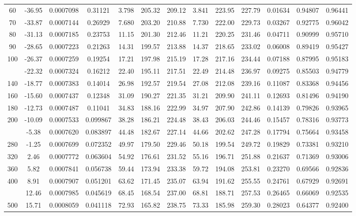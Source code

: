 \documentclass[12pt,a3paper]{article}
\begin{document}
\begin{enumerate}
\begin{center}
\begin{longtable}{c c c c c c c c c c c c c}
60 & -36.95 & 0.0007098 & 0.31121 & 3.798 & 205.32 & 209.12 & 3.841 & 223.95 & 227.79 & 0.01634 & 0.94807 & 0.96441 \\
70 & -33.87 & 0.0007144 & 0.26929 & 7.680 & 203.20 & 210.88 & 7.730 & 222.00 & 229.73 & 0.03267 & 0.92775 & 0.96042 \\
80 & -31.13 & 0.0007185 & 0.23753 & 11.15 & 201.30 & 212.46 & 11.21 & 220.25 & 231.46 & 0.04711 & 0.90999 & 0.95710 \\
90 & -28.65 & 0.0007223 & 0.21263 & 14.31 & 199.57 & 213.88 & 14.37 & 218.65 & 233.02 & 0.06008 & 0.89419 & 0.95427 \\
100 & -26.37 & 0.0007259 & 0.19254 & 17.21 & 197.98 & 215.19 & 17.28 & 217.16 & 234.44 & 0.07188 & 0.87995 & 0.95183 \\
\addlinespace
120 & -22.32 & 0.0007324 & 0.16212 & 22.40 & 195.11 & 217.51 & 22.49 & 214.48 & 236.97 & 0.09275 & 0.85503 & 0.94779 \\
140 & -18.77 & 0.0007383 & 0.14014 & 26.98 & 192.57 & 219.54 & 27.08 & 212.08 & 239.16 & 0.11087 & 0.83368 & 0.94456 \\
160 & -15.60 & 0.0007437 & 0.12348 & 31.09 & 190.27 & 221.35 & 31.21 & 209.90 & 241.11 & 0.12693 & 0.81496 & 0.94190 \\
180 & -12.73 & 0.0007487 & 0.11041 & 34.83 & 188.16 & 222.99 & 34.97 & 207.90 & 242.86 & 0.14139 & 0.79826 & 0.93965 \\
200 & -10.09 & 0.0007533 & 0.099867 & 38.28 & 186.21 & 224.48 & 38.43 & 206.03 & 244.46 & 0.15457 & 0.78316 & 0.93773 \\
\addlinespace
240 & -5.38 & 0.0007620 & 0.083897 & 44.48 & 182.67 & 227.14 & 44.66 & 202.62 & 247.28 & 0.17794 & 0.75664 & 0.93458 \\
280 & -1.25 & 0.0007699 & 0.072352 & 49.97 & 179.50 & 229.46 & 50.18 & 199.54 & 249.72 & 0.19829 & 0.73381 & 0.93210 \\
320 & 2.46 & 0.0007772 & 0.063604 & 54.92 & 176.61 & 231.52 & 55.16 & 196.71 & 251.88 & 0.21637 & 0.71369 & 0.93006 \\
360 & 5.82 & 0.0007841 & 0.056738 & 59.44 & 173.94 & 233.38 & 59.72 & 194.08 & 253.81 & 0.23270 & 0.69566 & 0.92836 \\
400 & 8.91 & 0.0007907 & 0.051201 & 63.62 & 171.45 & 235.07 & 63.94 & 191.62 & 255.55 & 0.24761 & 0.67929 & 0.92691 \\
\addlinespace
450 & 12.46 & 0.0007985 & 0.045619 & 68.45 & 168.54 & 237.00 & 68.81 & 188.71 & 257.53 & 0.26465 & 0.66069 & 0.92535 \\
500 & 15.71 & 0.0008059 & 0.041118 & 72.93 & 165.82 & 238.75 & 73.33 & 185.98 & 259.30 & 0.28023 & 0.64377 & 0.92400 \\

\end{longtable}
\end{center}
\end{enumerate}
\end{document}
